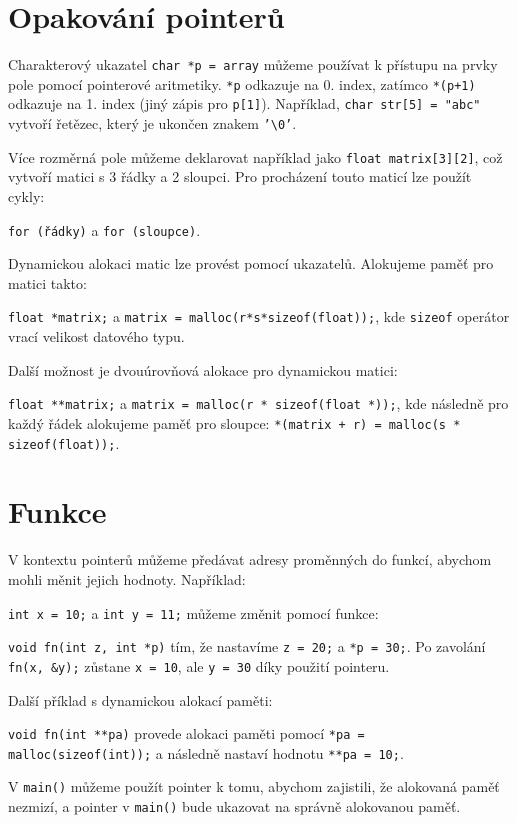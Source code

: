 \documentclass{article}
\begin{document}
\sloppy

\section{Opakování pointerů}

Charakterový ukazatel \texttt{char *p = array} můžeme používat k přístupu na prvky pole pomocí pointerové aritmetiky.
\texttt{*p} odkazuje na 0. index, zatímco \texttt{*(p+1)} odkazuje na 1. index (jiný zápis pro \texttt{p[1]}).
Například, \texttt{char str[5] = "abc"} vytvoří řetězec, který je ukončen znakem \texttt{'\textbackslash0'}.

Více rozměrná pole můžeme deklarovat například jako \texttt{float matrix[3][2]}, což vytvoří matici s 3 řádky a 2 sloupci.
Pro procházení touto maticí lze použít cykly:

\texttt{for (řádky)} a \texttt{for (sloupce)}.

Dynamickou alokaci matic lze provést pomocí ukazatelů. Alokujeme paměť pro matici takto:

\texttt{float *matrix;}
a \texttt{matrix = malloc(r*s*sizeof(float));}, kde \texttt{sizeof} operátor vrací velikost datového typu.

Další možnost je dvouúrovňová alokace pro dynamickou matici:

\texttt{float **matrix;} a \texttt{matrix = malloc(r * sizeof(float *));},
kde následně pro každý řádek alokujeme paměť pro sloupce: \texttt{*(matrix + r) = malloc(s * sizeof(float));}.

\section{Funkce}

V kontextu pointerů můžeme předávat adresy proměnných do funkcí, abychom mohli měnit jejich hodnoty. Například:

\texttt{int x = 10;} a \texttt{int y = 11;} můžeme změnit pomocí funkce:

\texttt{void fn(int z, int *p)} tím, že nastavíme \texttt{z = 20;} a \texttt{*p = 30;}.
Po zavolání \texttt{fn(x, \&y);} zůstane \texttt{x = 10}, ale \texttt{y = 30} díky použití pointeru.

Další příklad s dynamickou alokací paměti:

\texttt{void fn(int **pa)} provede alokaci paměti pomocí \texttt{*pa = malloc(sizeof(int));}
a následně nastaví hodnotu \texttt{**pa = 10;}.

V \texttt{main()} můžeme použít pointer k tomu, abychom zajistili, že alokovaná paměť nezmizí,
a pointer v \texttt{main()} bude ukazovat na správně alokovanou paměť.
\end{document}
